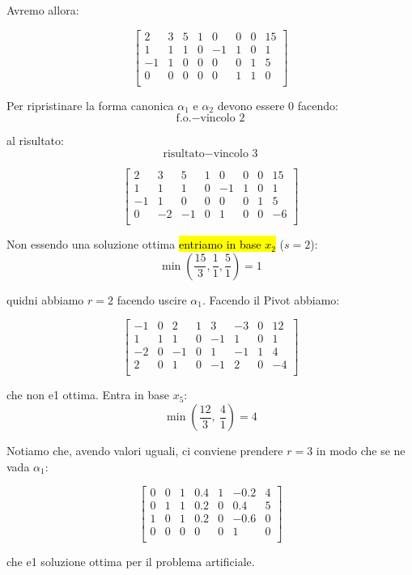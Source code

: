 Avremo allora:

$$
\left[ {\begin{array}{cccccccc}
	2 & 3 & 5 & 1 & 0 & 0 & 0 & 15\\
	1 & 1 & 1 & 0 & -1 & 1 & 0 & 1\\
	-1 & 1 & 0 & 0 & 0 & 0 & 1 & 5\\
	0 & 0 & 0 & 0 & 0 & 1 & 1 & 0\\
\end{array} } \right]
$$

Per ripristinare la forma canonica $\alpha_1$ e $\alpha_2$ devono essere $0$ facendo:
$$\text{f.o.} - \text{vincolo 2}$$

al risultato:
$$\text{risultato} - \text{vincolo 3}$$

$$
\left[ {\begin{array}{cccccccc}
	2 & 3 & 5 & 1 & 0 & 0 & 0 & 15\\
	1 & 1 & 1 & 0 & -1 & 1 & 0 & 1\\
	-1 & 1 & 0 & 0 & 0 & 0 & 1 & 5\\
	0 & -2 & -1 & 0 & 1 & 0 & 0 & -6\\
\end{array} } \right]
$$

Non essendo una soluzione ottima \hl{entriamo in base $x_2$} ($s = 2$):
$$\min (\frac{15}{3}, \frac{1}{1}, \frac{5}{1}) = 1$$

quidni abbiamo $r = 2$ facendo uscire $\alpha_1$. Facendo il Pivot abbiamo:

$$
\left[ {\begin{array}{cccccccc}
	-1 & 0 & 2 & 1 & 3 & -3 & 0 & 12\\
	1 & 1 & 1 & 0 & -1 & 1 & 0 & 1\\
	-2 & 0 & -1 & 0 & 1 & -1 & 1 & 4\\
	2 & 0 & 1 & 0 & -1 & 2 & 0 & -4\\
\end{array} } \right]
$$

che non e1 ottima. Entra in base $x_5$:
$$\min (\frac{12}{3},\ \frac{4}{1}) = 4$$

Notiamo che, avendo valori uguali, ci conviene prendere $r = 3$ in modo che se ne vada $\alpha_1$:

$$
\left[ {\begin{array}{ccccccc}
	0 & 0 & 1 & 0.4 & 1 & -0.2 & 4\\
	0 & 1 & 1 & 0.2 & 0 & 0.4 & 5\\
	1 & 0 & 1 & 0.2 & 0 & -0.6 & 0\\
	0 & 0 & 0 & 0 & 0 & 1 & 0\\
\end{array} } \right]
$$

che e1 soluzione ottima per il problema artificiale.